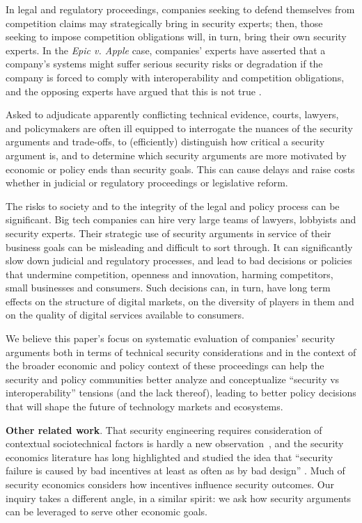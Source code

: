 \documentclass[letterpaper,twocolumn,10pt]{article}
\newcommand{\subh}[1]{\smallskip \noindent \textbf{{#1}}.}
\renewcommand{\paragraph}[1]{\subh{#1}}
\begin{document}
In legal and regulatory proceedings, companies seeking to defend themselves from competition claims may strategically bring in security experts; then, those seeking to impose competition obligations will, in turn, bring their own security experts. In the \emph{Epic v. Apple} case, companies' experts have asserted that a company’s systems might suffer serious security risks or degradation if the company is forced to comply with interoperability and competition obligations, and the opposing experts have argued that this is not true 
\cite{epic_apple_blog}.

Asked to adjudicate apparently conflicting technical evidence, courts, lawyers, and policymakers are often ill equipped to interrogate the nuances of the security arguments and trade-offs, to (efficiently) distinguish how critical a security argument is, and to determine which security arguments are more motivated by economic or policy ends than security goals. This can cause delays and raise costs whether in judicial or regulatory proceedings or legislative reform. 

The risks to society and to the integrity of the legal and policy process can be significant. Big tech companies can hire very large teams of lawyers, lobbyists and security experts. Their strategic use of security arguments in service of their business goals can be misleading and difficult to sort through. It can significantly slow down judicial and regulatory processes, and lead to bad decisions or policies that undermine competition, openness and innovation, harming competitors, small businesses and consumers. Such decisions can, in turn, have long term effects on the structure of digital markets, on the diversity of players in them and on the quality of digital services available to consumers.

We believe this paper’s focus on systematic evaluation of companies’ security arguments both in terms of technical security considerations and in the context of the broader economic and policy context of these proceedings can help the security and policy communities better analyze and conceptualize “security vs interoperability” tensions (and the lack thereof), leading to better policy decisions that will shape the future of technology markets and ecosystems.


\paragraph{Other related work}
That security engineering requires consideration of contextual sociotechnical factors is hardly a new observation~\cite{ross_book}, and the security economics literature has long highlighted and studied the idea that ``security failure is caused by bad
incentives at least as often as by bad design'' \cite{AM07,ross_econ}. Much of security economics considers how incentives influence security outcomes. Our inquiry takes a different angle, in a similar spirit: we ask how security arguments can be leveraged to serve other economic goals.
\end{document}
